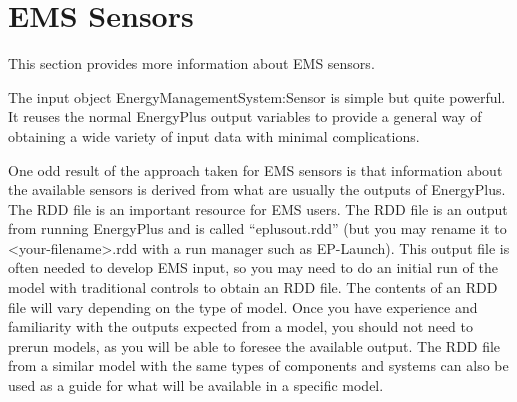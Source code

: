 \chapter{EMS Sensors}\label{ems-sensors}

This section provides more information about EMS sensors.

The input object EnergyManagementSystem:Sensor is simple but quite powerful. It reuses the normal EnergyPlus output variables to provide a general way of obtaining a wide variety of input data with minimal complications.

One odd result of the approach taken for EMS sensors is that information about the available sensors is derived from what are usually the outputs of EnergyPlus. The RDD file is an important resource for EMS users. The RDD file is an output from running EnergyPlus and is called ``eplusout.rdd'' (but you may rename it to \textless{}your-filename\textgreater{}.rdd with a run manager such as EP-Launch). This output file is often needed to develop EMS input, so you may need to do an initial run of the model with traditional controls to obtain an RDD file. The contents of an RDD file will vary depending on the type of model. Once you have experience and familiarity with the outputs expected from a model, you should not need to prerun models, as you will be able to foresee the available output. The RDD file from a similar model with the same types of components and systems can also be used as a guide for what will be available in a specific model.
